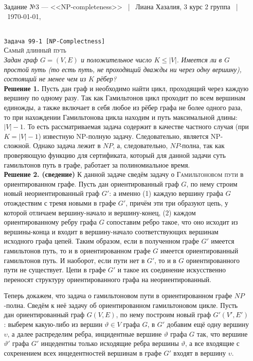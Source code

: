 \documentclass[10pt]{article}
\begin{document}
\def\chap#1#2{\ \\ {\large\bf#1 \ | \ \tt\scshape#2} \par}

{\bf
\small\centerline{Задание №3 --- <<NP-completeness>> \ | \ Лиана Хазалия, 3 курс 2 группа \ | \ \today, \currenttime}}
\ \\
\rm
{\large\texttt{Задача 99-1 [NP-Complectness]}}
\\
\textsc{Самый длинный путь}
\ \\[0.2cm]
\textit{Задан граф $G=(V,E)$ и положительное число $K\leq |V|$. Имеется ли в $G$ простой путь (то есть путь, не проходящий дважды ни через одну вершину), состоящий не менее чем из $K$ рёбер?}
\ \\[0.2cm]
\textbf{Решение 1.}  Пусть дан граф и необходимо найти цикл, проходящий через каждую вершину по одному разу. Так как Гамильтонов цикл проходит по всем вершинам единожды, а также включает в себя любое из рёбер графа не более одного раза, то при нахождении Гамильтонова цикла находим и путь максимальной длины: $|V|-1$. То есть рассматриваемая задача содержит в качестве частного случая (при $K=|V|-1$) известную NP-полную задачу. Следовательно, является NP-сложной. Однако задача лежит в $NP$, а, следовательно, $NP$-полна, так как проверяющую функцию для сертификата, который для данной задачи суть гамильтонов путь в графе, работает за полиномиальное время.
\ \\[0.2cm]
\textbf{Решение 2. (сведение)}  
 К данной задаче сведём задачу о \textsc{Гамильтоновом пути} в ориентированном графе. Пусть дан ориентированный граф $G$, по нему строим новый неориентированный граф $G'$: а именно (1) каждую вершину графа $G$ отождествим с тремя новыми в графе $G'$, причём эти три образуют цепь, у которой отличаем вершину-начало и вершину-конец, (2) каждом ориентированному ребру графа $G$ сопоставим ребро такое, что оно исходит из вершины-конца и входит в вершину-начало соответствующих вершинам исходного графа цепей. Таким образом, если в полученном графе $G'$ имеется гамильтонов путь, то и в ориентированном графе $G$ имеется ориентированный гамильтонов путь. И наоборот, если пути нет в $G'$, то и в $G$ ориентированного пути не существует. Цепи в графе $G'$ и такое их соединение искусственно переносят структуру ориентированного графа на неориентированный.
\medskip\par
Теперь докажем, что задача о гамильтоновом пути в ориентированном графе $NP$-полна. Сведём к неё задачу об ориентированном гамильтоновом цикле. Пусть дан ориентированный граф $G(V, E)$, по нему построим новый граф $G'(V', E')$: выберем какую-либо из вершин $\vartheta \in V$ графа $G$, в $G'$ добавим ещё одну вершину $\upsilon$, а далее распределим ребра, инцидентные вершине $\vartheta$ графа $G$ так, что вершине $\vartheta'$ графа $G'$ инцедентны только исходящие ребра вершины $\vartheta$, а все входящие с сохренением всех инцедентностей вершинам в графе $G'$ входят в вершину $\upsilon$.
\end{document}
